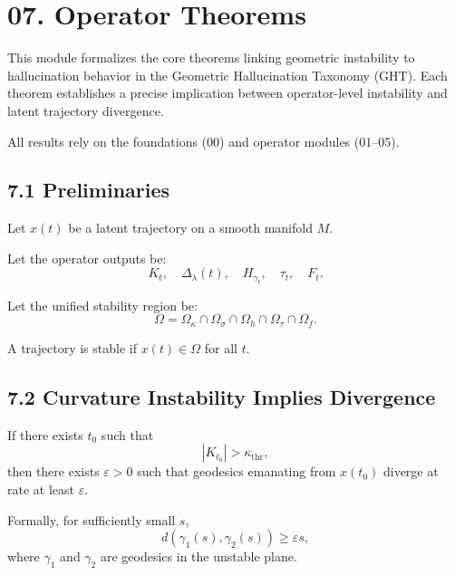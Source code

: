 
\section*{07. Operator Theorems}

This module formalizes the core theorems linking geometric instability
to hallucination behavior in the Geometric Hallucination Taxonomy (GHT).
Each theorem establishes a precise implication between operator-level
instability and latent trajectory divergence.

All results rely on the foundations (00) and operator modules (01–05).

\subsection*{7.1 Preliminaries}

Let $x(t)$ be a latent trajectory on a smooth manifold $M$.

Let the operator outputs be:
\[
K_t, \quad
\Delta_\lambda(t), \quad
H_{\gamma_t}, \quad
\tau_t, \quad
F_t.
\]

Let the unified stability region be:
\[
\Omega
= \Omega_{\kappa}
\cap \Omega_{\sigma}
\cap \Omega_{h}
\cap \Omega_{\tau}
\cap \Omega_{f}.
\]

A trajectory is stable if $x(t) \in \Omega$ for all $t$.

\subsection*{7.2 Curvature Instability Implies Divergence}

\begin{theorem}
If there exists $t_0$ such that
\[
|K_{t_0}| > \kappa_{\mathrm{thr}},
\]
then there exists $\varepsilon > 0$ such that geodesics emanating from
$x(t_0)$ diverge at rate at least $\varepsilon$.

Formally, for sufficiently small $s$,
\[
d(\gamma_1(s), \gamma_2(s)) \ge \varepsilon s,
\]
where $\gamma_1$ and $\gamma_2$ are geodesics in the unstable plane.
\end{theorem}

